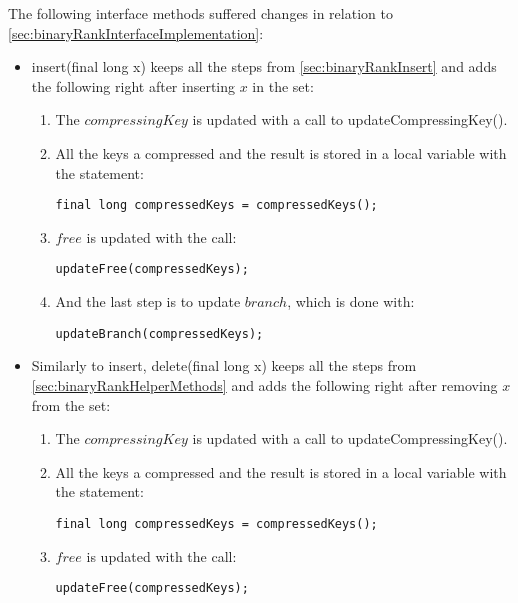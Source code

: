 The following interface methods suffered changes in relation to \ref{sec:binaryRankInterfaceImplementation}:
\begin{itemize}
    \item
    {\ttfamily insert(final long x)} keeps all the steps from \ref{sec:binaryRankInsert} and adds the following right after inserting $x$ in the set:
    \begin{enumerate}
        \item
        The $compressingKey$ is updated with a call to {\ttfamily updateCompressingKey()}.
        
        \item
        All the keys a compressed and the result is stored in a local variable with the statement:
        \begin{lstlisting}
final long compressedKeys = compressedKeys();
        \end{lstlisting}
        
        \item
        $free$ is updated with the call:
        \begin{lstlisting}
updateFree(compressedKeys);
        \end{lstlisting}
        
        \item
        And the last step is to update $branch$, which is done with:
        \begin{lstlisting}
updateBranch(compressedKeys);
        \end{lstlisting}
    \end{enumerate}
    
    \item
    Similarly to {\ttfamily insert}, {\ttfamily delete(final long x)} keeps all the steps from \ref{sec:binaryRankHelperMethods} and adds the following right after removing $x$ from the set:
    \begin{enumerate}
        \item
        The $compressingKey$ is updated with a call to {\ttfamily updateCompressingKey()}.
        
        \item
        All the keys a compressed and the result is stored in a local variable with the statement:
        \begin{lstlisting}
final long compressedKeys = compressedKeys();
        \end{lstlisting}
        
        \item
        $free$ is updated with the call:
        \begin{lstlisting}
updateFree(compressedKeys);
        \end{lstlisting}
        

\end{enumerate}
\end{itemize}

